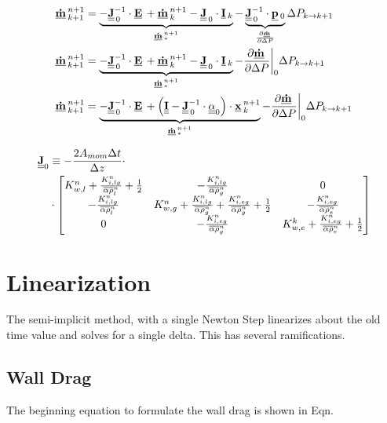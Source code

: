  \begin{align}
 \vec{\dot{m}}^{n+1}_{k+1} & =
 \underbrace{-\mat{J}_{\,0}^{-1}\cdot \vec{E} + \vec{\dot{m}}^{n+1}_{k} - \mat{J}_{\,0}\cdot \vec{I}_{k}}_{\vec{\dot{m}}^{n+1}_{*}} - \underbrace{\mat{J}_{\,0}^{-1} \cdot \vec{p}_{0}}_{\frac{\partial \vec{\dot{m}}}{\partial \Delta P}} \Delta P_{k \rightarrow k+1} \\
 \vec{\dot{m}}^{n+1}_{k+1} & =
 \underbrace{-\mat{J}_{\,0}^{-1}\cdot \vec{E} + \vec{\dot{m}}^{n+1}_{k} - \mat{J}_{\,0}\cdot \vec{I}_{k}}_{\vec{\dot{m}}^{n+1}_{*}} - \frac{\partial \vec{\dot{m}}}{\partial \Delta P}\bigg|_{0} \Delta P_{k \rightarrow k+1} \\
 \vec{\dot{m}}^{n+1}_{k+1} & =
 \underbrace{-\mat{J}_{\,0}^{-1}\cdot \vec{E} + \left(\mat{I} - \mat{J}^{-1}_{\,0}\cdot \mat{\alpha}_{0}\right)\cdot\vec{x}^{n+1}_{k}}_{\vec{\dot{m}}^{n+1}_{*}} - \frac{\partial \vec{\dot{m}}}{\partial \Delta P}\bigg|_{0} \Delta P_{k \rightarrow k+1}
\end{align}


 \begin{align}
 \Mat{J}_{0} & \equiv -\frac{2 A_{mom}\Delta t}{\Delta z}\cdot \nonumber \\
 &\cdot \begin{bmatrix} 
 K^{n}_{w,l} + \frac{K^{n}_{i,lg}}{\Ave{\alpha\rho}^{n}_{l}} +\frac{1}{2} &  -\frac{K^{n}_{i,lg}}{\Ave{\alpha\rho}^{n}_{g}} & 0\\
 -\frac{K^{n}_{i,lg}}{\Ave{\alpha\rho}^{n}_{l}} &  K^{n}_{w,g} + \frac{K^{n}_{i,lg}}{\Ave{\alpha\rho}^{n}_{g}}+\frac{K^{n}_{i,eg}}{\Ave{\alpha\rho}^{n}_{g}} +\frac{1}{2} & -\frac{K^{n}_{i,eg}}{\Ave{\alpha\rho}^{n}_{e}}\\
 0 & -\frac{K^{n}_{i,eg}}{\Ave{\alpha\rho}^{n}_{g}} &  K^{k}_{w,e} + \frac{K^{n}_{i,eg}}{\Ave{\alpha\rho}^{n}_{e}}+\frac{1}{2}\\
 \end{bmatrix}
 \end{align}

\section{Linearization}
The semi-implicit method, with a single Newton Step linearizes about the old time value and solves for a single delta. This has several ramifications.

\subsection{Wall Drag}
The beginning equation to formulate the wall drag is shown in Eqn.

